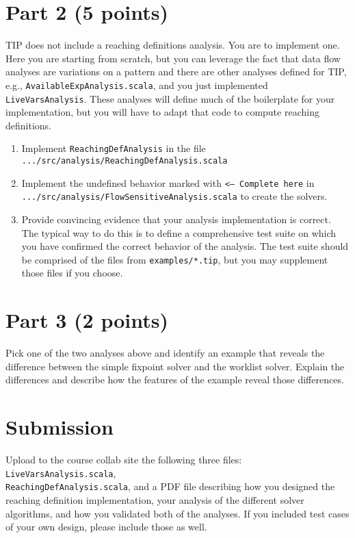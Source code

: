 \documentclass[12pt,letterpaper]{article}
\begin{document}
\section*{Part 2 (5 points)}
TIP does not include a reaching definitions analysis.  You are to implement one.
Here you are starting from scratch, but you can leverage the fact that data flow analyses are variations on a pattern and there are other analyses defined for TIP, e.g., \texttt{AvailableExpAnalysis.scala}, and you just implemented \texttt{LiveVarsAnalysis}.  These analyses will define much of the boilerplate for your implementation, but you will have to adapt that code to compute reaching definitions.
\begin{enumerate}
\item Implement \texttt{ReachingDefAnalysis} in the file \texttt{.../src/analysis/ReachingDefAnalysis.scala}
\item Implement the undefined behavior marked with \texttt{<--- Complete here} in\\ 
\texttt{.../src/analysis/FlowSensitiveAnalysis.scala} to create the solvers.
\item Provide convincing evidence that your analysis implementation is correct.  The typical way to do this is to define a comprehensive test suite on which you have confirmed the correct behavior of the analysis.  The test suite should be comprised of the files from \texttt{examples/*.tip}, but you may supplement those files if you choose.
\end{enumerate}

\section*{Part 3 (2 points)}
Pick one of the two analyses above and identify an example that reveals the difference between the simple fixpoint solver and the worklist solver.  Explain the differences and describe how the features of the example reveal those differences.

\section*{Submission} 
Upload to the course collab site the following three files: \texttt{LiveVarsAnalysis.scala},\\
\texttt{ReachingDefAnalysis.scala}, and a PDF file describing how you designed the reaching definition implementation, your analysis of the different solver algorithms, and how you validated both of the analyses.  If you included test cases of your own design, please include those as well.
\end{document}
